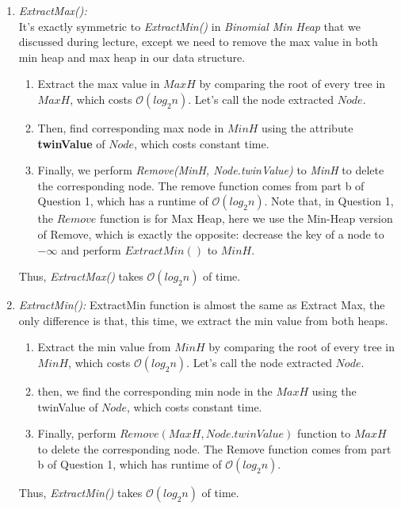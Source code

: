 \documentclass[10pt]{article}
\begin{document}
\begin{enumerate}
\begin{enumerate}
\item \textit{ExtractMax():}\\
It's exactly symmetric to \textit{ExtractMin()} in \textit{Binomial Min Heap} that we discussed during lecture, except we need to remove the max value in both min heap and max heap in our data structure.
\begin{enumerate}
\item Extract the max value in $MaxH$ by comparing the root of every tree in $MaxH$, which costs $\mathcal{O}(log_2n)$. Let's call the node extracted $Node$.
\item Then, find corresponding max node in $MinH$ using the attribute \textbf{twinValue} of $Node$, which costs constant time.
\item Finally, we perform \textit{Remove(MinH, Node.twinValue)} to \textit{MinH} to delete the corresponding node. The remove function comes from part b of Question 1, which has a runtime of $\mathcal{O}(log_2n)$. Note that, in Question 1, the $Remove$ function is for Max Heap, here we use the Min-Heap version of Remove, which is exactly the opposite: decrease the key of a node to $-\infty$ and perform $ExtractMin()$ to $MinH$.
\end{enumerate}

Thus, \textit{ExtractMax()} takes $\mathcal{O}( log_2n)$ of time.

\item \textit{ExtractMin():}
ExtractMin function is almost the same as Extract Max, the only difference is that, this time, we extract the min value from both heaps.
\begin{enumerate}
\item Extract the min value from $MinH$ by comparing the root of every tree in $MinH$, which costs $\mathcal{O}(log_2n)$. Let's call the node extracted $Node$.
\item then, we find the corresponding min node in the $MaxH$ using the twinValue of $Node$, which costs constant time.
\item Finally, perform $Remove(MaxH, Node.twinValue)$ function to $MaxH$ to delete the corresponding node. The Remove function comes from part b of Question 1, which has runtime of $\mathcal{O}(log_2n)$.
\end{enumerate}

Thus, \textit{ExtractMin()} takes $\mathcal{O}( log_2n)$ of time.
\end{enumerate}
\end{enumerate}
\newpage
\end{document}
